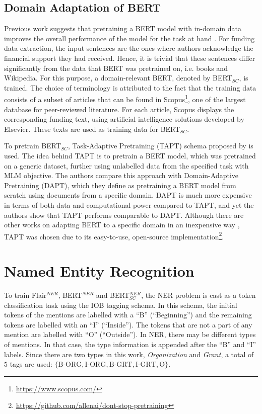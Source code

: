 \documentclass{report}
\theoremstyle{definition}
\theoremstyle{remark}
\begin{document}
\subsection{Domain Adaptation of BERT}
Previous work suggests that pretraining a BERT model with in-domain data improves the overall performance of the model for the task at hand \textcolor{red}{\cite{}}. For funding data extraction, the input sentences are the ones where authors acknowledge the financial support they had received. Hence, it is trivial that these sentences differ significantly from the data that BERT was pretrained on, i.e. books and Wikipedia.  For this purpose, a domain-relevant BERT, denoted by BERT$_{SC}$, is trained. The choice of terminology is attributed to the fact that the training data consists of a subset of articles that can be found in Scopus\footnote{\url{https://www.scopus.com/}}, one of the largest database for peer-reviewed literature. For each article, Scopus displays the corresponding funding text, using artificial intelligence solutions developed by Elsevier. These texts are used as training data for BERT$_{SC}$.

To pretrain BERT$_{SC}$, Task-Adaptive Pretraining (TAPT) schema proposed by \cite{DontStop} is used. The idea behind TAPT is to pretrain a BERT model, which was pretrained on a generic dataset, further using unlabelled data from the specified task with MLM objective. The authors compare this approach with Domain-Adaptive Pretraining (DAPT), which they define as pretraining a BERT model from scratch using documents from a specific domain. DAPT is much more expensive in terms of both data and computational power compared to TAPT, and yet the authors show that TAPT performs comparable to DAPT. Although there are other works on adapting BERT to a specific domain in an inexpensive way \textcolor{red}{\cite{}}, TAPT was chosen due to its easy-to-use, open-source implementation\footnote{\url{https://github.com/allenai/dont-stop-pretraining}}.


\section{Named Entity Recognition}
\label{sec:NERMEThod}

To train  Flair$^{NER}$, BERT$^{NER}$ and BERT$^{NER}_{SC}$, the NER problem is cast as a token classification task using the IOB tagging schema. In this schema, the initial tokens of the mentions are labelled with a ``B'' (``Beginning'') and the remaining tokens are labelled with an ``I'' (``Inside''). The tokens that are not a part of any mention are labelled with ``O'' (``Outside''). In NER, there may be different types of mentions. In that case, the type information is appended after the ``B'' and ``I'' labels. Since there are two types in this work, \textit{Organization} and \textit{Grant}, a total of $5$ tags are used: $\{ \text{B-ORG}, \text{I-ORG}, \text{B-GRT}, \text{I-GRT}, \text{O} \}$.
\end{document}
